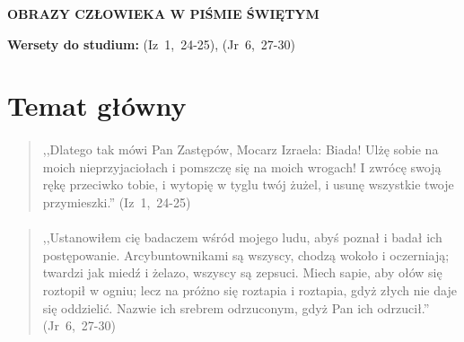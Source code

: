 \documentclass[10pt,a4paper,oneside]{article}
\begin{document}
\centerline{\textbf{\MakeUppercase{Obrazy człowieka w Piśmie Świętym}}}
\begin{center}
\textbf{Wersety do studium:} \mbox{(Iz 1, 24-25)}, \mbox{(Jr 6, 27-30)}
\end{center}
\section{Temat główny}
\paragraph{}
\begin{quote}
,,Dlatego tak mówi Pan Zastępów, Mocarz Izraela: Biada! Ulżę sobie na moich nieprzyjaciołach i pomszczę się na moich wrogach! I zwrócę swoją rękę przeciwko tobie, i wytopię w tyglu twój żużel, i usunę wszystkie twoje przymieszki.'' \mbox{(Iz 1, 24-25)}
\end{quote}
\paragraph{}
\begin{quote}
,,Ustanowiłem cię badaczem wśród mojego ludu, abyś poznał i badał ich postępowanie. Arcybuntownikami są wszyscy, chodzą wokoło i oczerniają; twardzi jak miedź i żelazo, wszyscy są zepsuci. Miech sapie, aby ołów się roztopił w ogniu; lecz na próżno się roztapia i roztapia, gdyż złych nie daje się oddzielić. Nazwie ich srebrem odrzuconym, gdyż Pan ich odrzucił.'' \mbox{(Jr 6, 27-30)}
\end{quote}
\end{document}
